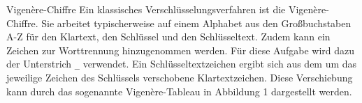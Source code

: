 \documentclass{article}
\begin{document}
\setcounter{subsection}{20}
\begin{exercise}{Vigenère-Chiffre}
  Ein klassisches Verschlüsselungsverfahren ist die Vigenère-Chiffre. Sie arbeitet typischerweise auf einem Alphabet aus den Großbuchstaben A-Z für den Klartext, den Schlüssel und den Schlüsseltext. Zudem kann ein Zeichen zur Worttrennung hinzugenommen werden. Für diese Aufgabe wird dazu der Unterstrich \texttt{\_} verwendet. Ein Schlüsseltextzeichen ergibt sich aus dem um das jeweilige Zeichen des Schlüssels verschobene Klartextzeichen. Diese Verschiebung kann durch das sogenannte Vigenère-Tableau in Abbildung 1 dargestellt werden.



\end{exercise}
\end{document}

